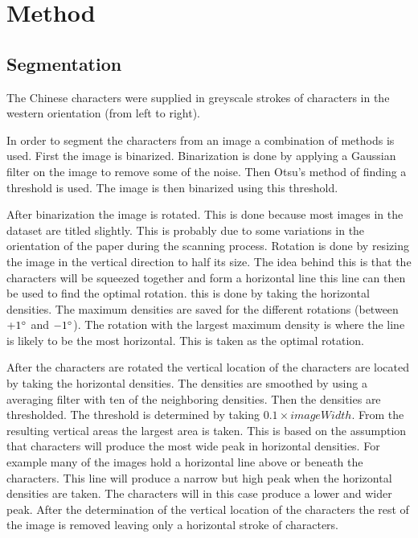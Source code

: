 \section{Method} %
\label{sec:method}


\subsection{Segmentation}


The Chinese characters were supplied in greyscale strokes of characters in the western orientation (from left to right).

In order to segment the characters from an image a combination of methods is used. First the image is binarized. Binarization is done by applying a Gaussian filter on the image to remove some of the noise. Then Otsu's method of finding a threshold is used. The image is then binarized using this threshold.


After binarization the image is rotated. This is done because most images in the dataset are titled slightly. This is probably due to some variations in the orientation of the paper during the scanning process. Rotation is done by resizing the image in the vertical direction to half its size. The idea behind this is that the characters will be squeezed together and form a horizontal line this line can then be used to find the optimal rotation. this is done by taking the horizontal densities. The maximum densities are saved for the different rotations (between $+1\degree$ and $-1\degree$). The rotation with the largest maximum density is where the line is likely to be the most horizontal. This is taken as the optimal rotation. 


After the characters are rotated the vertical location of the characters are located by taking the horizontal densities. The densities are smoothed by using a averaging filter with ten of the neighboring densities. Then the densities are thresholded. The threshold is determined by taking $0.1 \times imageWidth$. From the resulting vertical areas the largest area is taken. This is based on the assumption that characters will produce the most wide peak in horizontal densities. For example many of the images hold a horizontal line above or beneath the characters. This line will produce a narrow but high peak when the horizontal densities are taken. The characters will in this case produce a lower and wider peak. After the determination of the vertical location of the characters the rest of the image is removed leaving only a horizontal stroke of characters.

